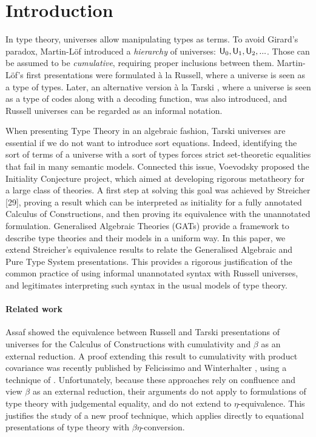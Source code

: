 \section{Introduction}

In type theory, universes allow manipulating types as terms.
To avoid Girard's paradox, Martin-Löf \cite{Martin-Lof-1972, MARTINLOF75} introduced a \textit{hierarchy} of universes: $\mathsf{U}_0, \mathsf{U}_1, \mathsf{U}_2, ...$.
Those can be assumed to be \textit{cumulative}, requiring proper inclusions between them.
Martin-Löf’s first presentations \cite{MARTINLOF75, MARTINLOF82} were formulated à la Russell, where a universe is seen as a type of types. Later, an alternative version à la Tarski \cite{MARTINLOF84}, where a universe is seen as a type of codes along with a decoding function, was also introduced, and Russell universes can be regarded as an informal notation. 

 When presenting Type Theory in an algebraic fashion, Tarski universes are essential if we do not want to introduce sort equations. Indeed, identifying the sort of terms of a universe with a sort of types forces strict set-theoretic equalities that fail in many semantic models. Connected this issue, Voevodsky proposed the Initiality Conjecture project, which aimed at developing rigorous metatheory for a large class of theories. A first step at solving this goal was achieved by Streicher [29], proving a result which can be interpreted as initiality for a fully annotated Calculus of Constructions, and then proving its equivalence with the unannotated formulation. Generalised Algebraic Theories (GATs) provide a framework to describe type theories and their models in a uniform way. In this paper, we extend Streicher’s equivalence results to relate the Generalised Algebraic and Pure Type System presentations. This provides a rigorous justification of the common practice of using informal unannotated syntax with Russell universes, and legitimates interpreting such syntax in the usual models of type theory.

\noindent
\paragraph*{Related work}
Assaf \cite{assaf} showed the equivalence between Russell and Tarski presentations of universes for the Calculus of Constructions with cumulativity and $\beta$ as an external reduction. A proof extending this result to cumulativity with product covariance was recently published by Felicissimo and Winterhalter \cite{tiago-fscd}, using a technique of \citet{Streicher}. Unfortunately, because these approaches rely on confluence and view $\beta$ as an external reduction, their arguments do not apply to formulations of type theory with judgemental equality, and do not extend to $\eta$-equivalence. This justifies the study of a new proof technique, which applies directly to equational presentations of type theory with $\beta\eta$-conversion.


